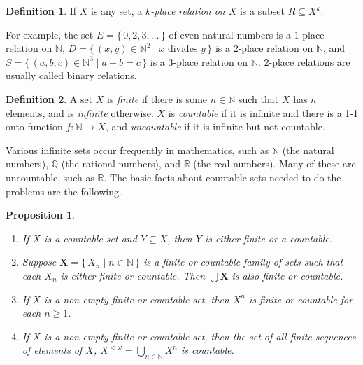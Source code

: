 \documentclass[12pt]{amsbook}
\theoremstyle{plain}
\newtheorem{prop}[thm]{Proposition}
\theoremstyle{definition}
\newtheorem{defn}{Definition}[chapter]
\theoremstyle{remark}
\begin{document}
\begin{defn}
If $X$ is any set,  a {\em $k$-place relation on $X$\/} is a subset $R \subseteq X^k$. 
\end{defn}

For example,  the set $E = \{\, 0, 2, 3, \dots \,\}$ of even natural numbers is a $1$-place relation on $\mathbb{N}$,  $D = \{\, (x,y) \in \mathbb{N}^2 \mid x \text{\ divides\ } y \,\}$ is a $2$-place relation on $\mathbb{N}$,  and $S = \{\, (a,b,c) \in \mathbb{N}^3 \mid a + b = c \,\}$ is a $3$-place relation on $\mathbb{N}$.  $2$-place relations are usually called binary relations.

\begin{defn}
A set $X$ is {\em finite\/} if there is some $n \in \mathbb{N}$ such that $X$ has $n$ elements,  and is {\em infinite\/} otherwise.  $X$ is {\em countable\/} if it is infinite and there is a 1-1 onto function $f : \mathbb{N} \to X$,  and {\em uncountable\/} if it is infinite but not countable.
\end{defn}

Various infinite sets occur frequently in mathematics,  such as $\mathbb{N}$ (the natural numbers),  $\mathbb{Q}$ (the rational numbers),  and $\mathbb{R}$ (the real numbers).  Many of these are uncountable,  such as $\mathbb{R}$.  The basic facts about countable sets needed to do the problems are the following.

\begin{prop}
\begin{enumerate}
\item If $X$ is a countable set and $Y \subseteq X$,  then $Y$ is either finite or a countable.
\item Suppose $\mathbf{X} = \{\, X_n \mid n \in \mathbb{N} \,\}$ is a finite or countable family of sets such that each $X_n$ is either finite or countable.  Then $\bigcup \mathbf{X}$ is also finite or countable.
\item If $X$ is a non-empty finite or countable set,  then $X^n$ is finite or countable for each $n \ge 1$.
\item If $X$ is a non-empty finite or countable set,  then the set of all finite sequences of elements of $X$,  $X^{<\omega} = \bigcup_{n \in \mathbb{N}} X^n$ is countable.
\end{enumerate}
\end{prop}
\end{document}

